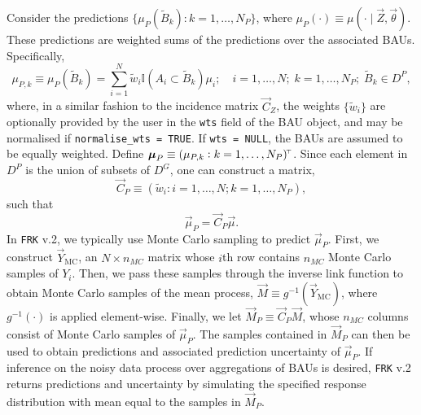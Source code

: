 \documentclass[12pt,a4paper]{article}
\begin{document}
Consider the predictions $\{\mu_P(\tilde{B}_k) : k = 1, \dots, N_P\}$, where $\mu_P(\cdot) \equiv \mu(\cdot \mid \vec{Z}, \vec{\theta})$. 
These predictions are weighted sums of the predictions over the associated BAUs. 
Specifically,
\[
    \mu_{P, k} \equiv \mu_P(\tilde{B}_k) = 
   \sum_{i = 1}^N \tilde{w}_i \mathbb{I}(A_i \subset \tilde{B}_k)\mu_i; \quad i = 1, \dots, N;\;  k = 1, \dots, N_P;\; \tilde{B}_k \in D^P,
\]
where, in a similar fashion to the incidence matrix $\vec{C}_Z$, the weights $\{\tilde{w}_i\}$ are optionally provided by the user in the \texttt{wts} field of the BAU object, and may be normalised if \mbox{\texttt{normalise\_wts = TRUE}}. 
If \texttt{wts = NULL}, the BAUs are assumed to be equally weighted. 
Define $\vec{\mu}_P \equiv (\mu_{P, k} : k = 1, \dots, N_P)^\tp$. 
Since each element in $D^P$ is the union of subsets of $D^G$, one can construct a matrix, 
\[
\vec{C}_P \equiv \left(\tilde{w}_i : i = 1, \dots, N; k = 1, \dots, N_P\right),
\]
such that
\[
\vec{\mu}_P = \vec{C}_P \vec{\mu}.
\]
In \texttt{FRK} v.2, we typically use Monte Carlo sampling to predict $\vec{\mu}_P$. 
First, we construct $\vec{Y}_{\text{MC}}$, an $N \times n_{MC}$ matrix whose $i$th row contains $n_{MC}$ Monte Carlo samples of $Y_i$. 
Then, we pass these samples through the inverse link function to obtain Monte Carlo samples of the mean process, $
\vec{M} \equiv g^{-1}(\vec{Y}_{\text{MC}})$,
where $g^{-1}(\cdot)$ is applied element-wise. 
Finally, we let $
\vec{M}_P \equiv \vec{C}_P \vec{M}$,
whose $n_{MC}$ columns consist of Monte Carlo samples of $\vec{\mu}_P$. 
The samples contained in $\vec{M}_P$ can then be used to obtain predictions and associated prediction uncertainty of $\vec{\mu}_P$.
If inference on the noisy data process over aggregations of BAUs is desired, \texttt{FRK} v.2 returns predictions and uncertainty by simulating the specified response distribution with mean equal to the samples in $\vec{M}_P$. 
\end{document}
